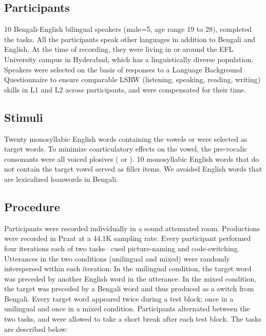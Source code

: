 \documentclass[12 pt]{article}
\newcommand{\nt}[1]{\textipa{[#1]}} %
\begin{document}
\subsection{Participants} \label{participants}

10 Bengali-English bilingual speakers (male=5, age range 19 to 28), completed the tasks. All the participants speak other languages in addition to Bengali and English. At the time of recording, they were living in or around the EFL University campus in Hyderabad, which has a linguistically diverse population. Speakers were selected on the basis of responses to a Language Background Questionnaire to ensure comparable LSRW (listening, speaking, reading, writing) skills in L1 and L2 across participants, and were compensated for their time.


\subsection{Stimuli}
Twenty monosyllabic English words containing the vowels \nt{2} or \nt{\ae} were selected as target words. To minimize coarticulatory effects on the vowel, the pre-vocalic consonants were all voiced plosives (\nt{b} or \nt{d}). 10 monosyllabic English words that do not contain the target vowel served as filler items. We avoided English words that are lexicalized loanwords in Bengali. %



\subsection{Procedure}
Participants were recorded individually in a sound attenuated room. %
Productions were recorded in Praat \citep{boersma2016praat} at a 44.1K sampling rate. Every participant performed four iterations each of two tasks-- cued picture-naming and code-switching. Utterances in the two conditions (unilingual and mixed) were randomly interspersed within each iteration. In the unilingual condition, the target word was preceded by another English word in the utterance. In the mixed condition, the target was preceded by a Bengali word and thus produced as a switch from Bengali. Every target word appeared twice during a test block; once in a unilingual and once in a mixed condition. Participants alternated between the two tasks, and were allowed to take a short break after each test block. The tasks are described below:
\end{document}
